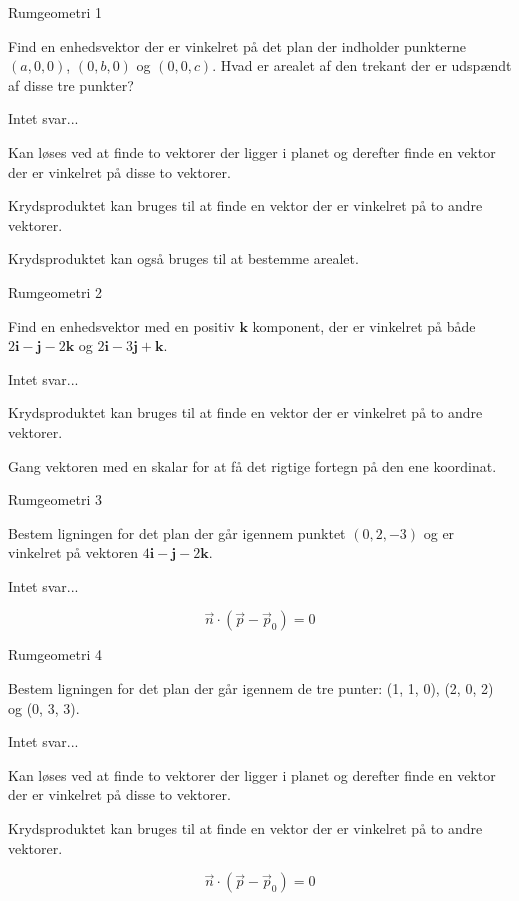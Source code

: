 \documentclass{article}
\begin{document}

\tableofcontents
\newpage

\begin{exercise}{Rumgeometri 1}

Find en enhedsvektor der er vinkelret på det plan
der indholder punkterne $(a, 0, 0)$, $(0, b, 0)$ og
$(0, 0, c)$.
Hvad er arealet af den trekant der er udspændt af
disse tre punkter?

Intet svar...

\hint
Kan løses ved at finde to vektorer der ligger i planet
og derefter finde en vektor der er vinkelret på
disse to vektorer.

\hint
Krydsproduktet kan bruges til at finde en vektor der
er vinkelret på to andre vektorer.

\hint
Krydsproduktet kan også bruges til at bestemme arealet.

\end{exercise}


\begin{exercise}{Rumgeometri 2}

Find en enhedsvektor med en positiv $\mathbf{k}$ komponent,
der er vinkelret på både
$2 \mathbf{i} - \mathbf{j} - 2 \mathbf{k}$
og
$2 \mathbf{i} - 3\mathbf{j} + \mathbf{k}$.

Intet svar...

\hint
Krydsproduktet kan bruges til at finde en vektor der
er vinkelret på to andre vektorer.

\hint
Gang vektoren med en skalar for at få det rigtige fortegn
på den ene koordinat.

\end{exercise}


\begin{exercise}{Rumgeometri 3}

Bestem ligningen for det plan der går igennem
punktet $(0, 2, -3)$ og er vinkelret på vektoren
$4 \mathbf{i} - \mathbf{j} - 2 \mathbf{k}$.

Intet svar...

\hint
\[
\vec{n} \cdot \left( \vec{p} - \vec{p}_0 \right) = 0
\]

\end{exercise}


\begin{exercise}{Rumgeometri 4}

Bestem ligningen for det plan der går igennem
de tre punter: (1, 1, 0), (2, 0, 2) og (0, 3, 3).

Intet svar...

\hint
Kan løses ved at finde to vektorer der ligger i planet
og derefter finde en vektor der er vinkelret på
disse to vektorer.

\hint
Krydsproduktet kan bruges til at finde en vektor der
er vinkelret på to andre vektorer.

\hint
\[
\vec{n} \cdot \left( \vec{p} - \vec{p}_0 \right) = 0
\]


\end{exercise}
\end{document}
